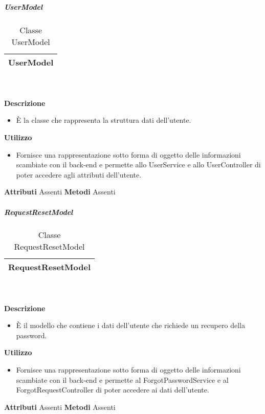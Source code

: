 			\subparagraph{UserModel} 
\begin{table}[ht]
\begin{center}
\bgroup
	\setlength{\arrayrulewidth}{0.6mm}
	\def\arraystretch{1}
		\begin{tabular}{ | p{12cm} | }
				\hline  
					\centerline{\textbf{UserModel}}
		\\ \hline 
				\hline
				\hline
		
		\end{tabular}
\egroup
\caption{Classe UserModel}
\end{center}
\end{table} \textbf{\\ \\ Descrizione}
\begin{itemize}
\item[] È la classe che rappresenta la struttura dati dell'utente.
\end{itemize} 
\textbf{Utilizzo}
\begin{itemize}
\item[] Fornisce una rappresentazione sotto forma di oggetto delle informazioni scambiate con il back-end e permette allo UserService e allo UserController di poter accedere agli attributi dell'utente.
\end{itemize}
\textbf{Attributi}
Assenti
\textbf{Metodi}
Assenti

			\subparagraph{RequestResetModel} 
\begin{table}[ht]
\begin{center}
\bgroup
	\setlength{\arrayrulewidth}{0.6mm}
	\def\arraystretch{1}
		\begin{tabular}{ | p{12cm} | }
				\hline  
					\centerline{\textbf{RequestResetModel}}
		\\ \hline 
				\hline
				\hline
		
		\end{tabular}
\egroup
\caption{Classe RequestResetModel}
\end{center}
\end{table} \textbf{\\ \\ Descrizione}
\begin{itemize}
\item[] È il modello che contiene i dati dell'utente che richiede un recupero della password.
\end{itemize} 
\textbf{Utilizzo}
\begin{itemize}
\item[] Fornisce una rappresentazione sotto forma di oggetto delle informazioni scambiate con il back-end e permette al ForgotPasswordService e al ForgotRequestController di poter accedere ai dati dell'utente.
\end{itemize}
\textbf{Attributi}
Assenti
\textbf{Metodi}
Assenti

